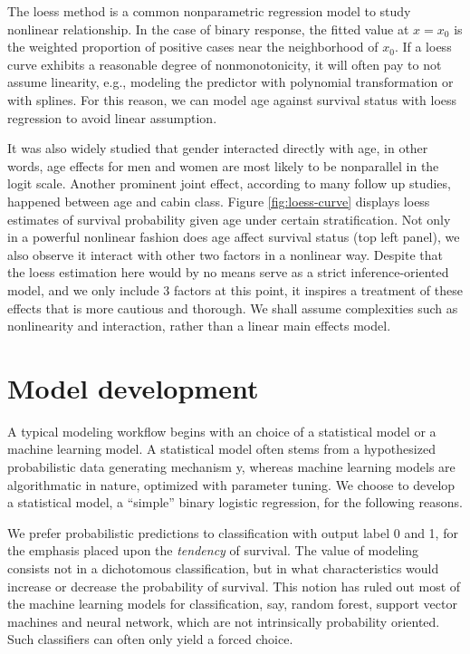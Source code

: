 \documentclass[]{interact}
\theoremstyle{plain}%
\theoremstyle{definition}
\theoremstyle{remark}
\begin{document}
The loess method is a common nonparametric regression model to study nonlinear relationship. In the case of binary response, the fitted value at \(x = x_0\) is the weighted proportion of positive cases near the neighborhood of \(x_0\). If a loess curve exhibits a reasonable degree of nonmonotonicity, it will often pay to not assume linearity, e.g., modeling the predictor with polynomial transformation or with splines. For this reason, we can model age against survival status with loess regression to avoid linear assumption.

It was also widely studied that gender interacted directly with age, in other words, age effects for men and women are most likely to be nonparallel in the logit scale. Another prominent joint effect, according to many follow up studies, happened between age and cabin class. Figure \ref{fig:loess-curve} displays loess estimates of survival probability given age under certain stratification. Not only in a powerful nonlinear fashion does age affect survival status (top left panel), we also observe it interact with other two factors in a nonlinear way. Despite that the loess estimation here would by no means serve as a strict inference-oriented model, and we only include 3 factors at this point, it inspires a treatment of these effects that is more cautious and thorough. We shall assume complexities such as nonlinearity and interaction, rather than a linear main effects model.

\hypertarget{dev}{%
\section{Model development}\label{dev}}

A typical modeling workflow begins with an choice of a statistical model or a machine learning model. A statistical model often stems from a hypothesized probabilistic data generating mechanism y, whereas machine learning models are algorithmatic in nature, optimized with parameter tuning. We choose to develop a statistical model, a ``simple'' binary logistic regression, for the following reasons.

We prefer probabilistic predictions to classification with output label 0 and 1, for the emphasis placed upon the \emph{tendency} of survival. The value of modeling consists not in a dichotomous classification, but in what characteristics would increase or decrease the probability of survival. This notion has ruled out most of the machine learning models for classification, say, random forest, support vector machines and neural network, which are not intrinsically probability oriented. Such classifiers can often only yield a forced choice.
\end{document}
